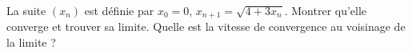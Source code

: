 La suite $(x_n)$ est définie par $x_0 = 0$, $x_{n+1} = \sqrt{4 + 3x_n}$. Montrer qu'elle converge et trouver sa limite. Quelle est la vitesse de convergence au voisinage de la limite ?
